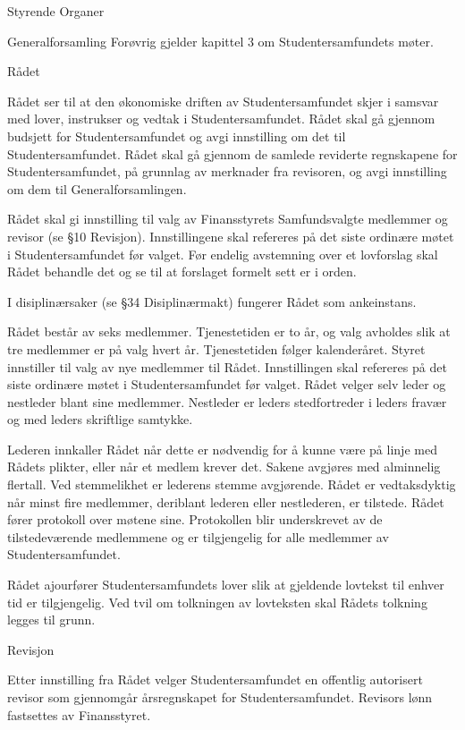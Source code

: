 \begin{lovkapittel}{Styrende Organer}
\begin{lovparagraf}{Generalforsamling}
Forøvrig gjelder kapittel 3 om Studentersamfundets møter.

    \end{lovparagraf}
    
    \begin{lovparagraf}{Rådet}
    
Rådet ser til at den økonomiske driften av Studentersamfundet skjer i samsvar med lover, instrukser og vedtak i
Studentersamfundet. Rådet skal gå gjennom budsjett for Studentersamfundet og avgi innstilling om det til
Studentersamfundet. Rådet skal gå gjennom de samlede reviderte regnskapene for Studentersamfundet, på grunnlag
av merknader fra revisoren, og avgi innstilling om dem til Generalforsamlingen. 

Rådet skal gi innstilling til valg av
Finansstyrets Samfundsvalgte medlemmer og revisor (se §10 Revisjon). Innstillingene skal refereres på det siste
ordinære møtet i Studentersamfundet før valget. Før endelig avstemning over et lovforslag skal Rådet behandle det og
se til at forslaget formelt sett er i orden. 

I disiplinærsaker (se §34 Disiplinærmakt) fungerer Rådet som ankeinstans.

Rådet består av seks medlemmer. Tjenestetiden er to år, og valg avholdes slik at tre medlemmer er på valg hvert år.
Tjenestetiden følger kalenderåret. Styret innstiller til valg av nye medlemmer til Rådet. Innstillingen skal refereres på
det siste ordinære møtet i Studentersamfundet før valget. Rådet velger selv leder og nestleder blant sine medlemmer.
Nestleder er leders stedfortreder i leders fravær og med leders skriftlige samtykke.

Lederen innkaller Rådet når dette er nødvendig for å kunne være på linje med Rådets plikter, eller når et medlem
krever det. Sakene avgjøres med alminnelig flertall. Ved stemmelikhet er lederens stemme avgjørende. Rådet er
vedtaksdyktig når minst fire medlemmer, deriblant lederen eller nestlederen, er tilstede. Rådet fører protokoll over
møtene sine. Protokollen blir underskrevet av de tilstedeværende medlemmene og er tilgjengelig for alle medlemmer
av Studentersamfundet.

Rådet ajourfører Studentersamfundets lover slik at gjeldende lovtekst til enhver tid er tilgjengelig. Ved tvil om
tolkningen av lovteksten skal Rådets tolkning legges til grunn.

  \end{lovparagraf}
  
  \begin{lovparagraf}{Revisjon}
  
Etter innstilling fra Rådet velger Studentersamfundet en offentlig autorisert revisor som gjennomgår årsregnskapet for
Studentersamfundet. Revisors lønn fastsettes av Finansstyret.

  \end{lovparagraf}
  
\end{lovkapittel}





